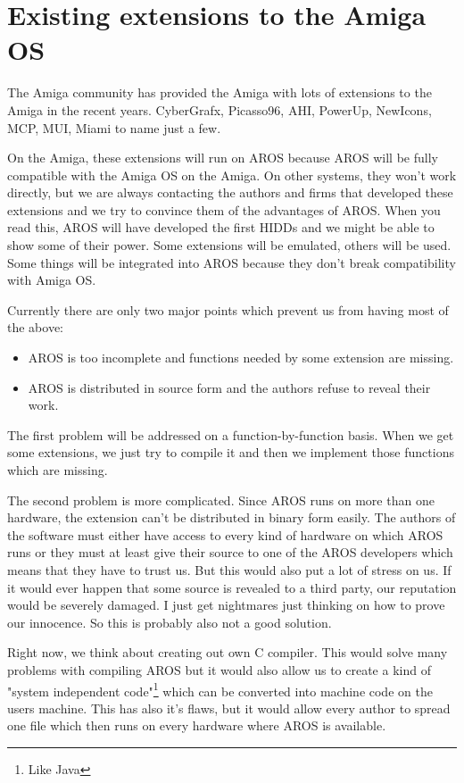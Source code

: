 \section{Existing extensions to the Amiga OS}

The Amiga community has provided the Amiga with lots of extensions to the
Amiga in the recent years. CyberGrafx, Picasso96, AHI, PowerUp, NewIcons,
MCP, MUI, Miami to name just a few.

On the Amiga, these extensions will run on AROS because AROS will be fully
compatible with the Amiga OS on the Amiga. On other systems, they won't work
directly, but we are always contacting the authors and firms that developed
these extensions and we try to convince them of the advantages of AROS. When
you read this, AROS will have developed the first HIDDs and we might be
able to show some of their power. Some extensions will be emulated, others
will be used. Some things will be integrated into AROS because they don't
break compatibility with Amiga OS.

Currently there are only two major points which prevent us from having most
of the above:

\begin{itemize}
\item AROS is too incomplete and functions needed by some extension are
missing.

\item AROS is distributed in source form and the authors refuse to reveal
their work.

\end{itemize}

The first problem will be addressed on a function-by-function basis. When we
get some extensions, we just try to compile it and then we implement those
functions which are missing.

The second problem is more complicated. Since AROS runs on more than one
hardware, the extension can't be distributed in binary form easily. The
authors of the software must either have access to every kind of hardware
on which AROS runs or they must at least give their source to one of the
AROS developers which means that they have to trust us. But this would also
put a lot of stress on us. If it would ever happen that some source is
revealed to a third party, our reputation would be severely damaged. I just
get nightmares just thinking on how to prove our innocence. So this is
probably also not a good solution.

Right now, we think about creating out own C compiler. This would solve
many problems with compiling AROS but it would also allow us to create a
kind of "system independent code"\footnote{Like Java} which can be
converted into machine code on the users machine. This has also it's flaws,
but it would allow every author to spread one file which then runs on every
hardware where AROS is available.

